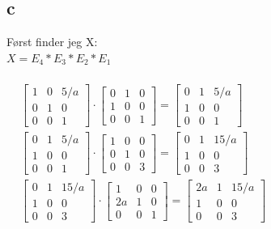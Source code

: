 \documentclass{article}
\begin{document}
\subsection*{c}
Først finder jeg X:
\\
$X=E_4*E_3*E_2*E_1$
\\
\\
$\begin{aligned} & {\left[\begin{array}{lll}1 & 0 & 5 / a \\ 0 & 1 & 0 \\ 0 & 0 & 1\end{array}\right] \cdot\left[\begin{array}{lll}0 & 1 & 0 \\ 1 & 0 & 0 \\ 0 & 0 & 1\end{array}\right]=\left[\begin{array}{lll}0 & 1 & 5 / a \\ 1 & 0 & 0 \\ 0 & 0 & 1\end{array}\right]} \\ & {\left[\begin{array}{lll}0 & 1 & 5 / a \\ 1 & 0 & 0 \\ 0 & 0 & 1\end{array}\right] \cdot\left[\begin{array}{lll}1 & 0 & 0 \\ 0 & 1 & 0 \\ 0 & 0 & 3\end{array}\right]=\left[\begin{array}{lll}0 & 1 & 15 / a \\ 1 & 0 & 0 \\ 0 & 0 & 3\end{array}\right]} \\ & {\left[\begin{array}{lll}0 & 1 & 15 / a \\ 1 & 0 & 0 \\ 0 & 0 & 3\end{array}\right] \cdot\left[\begin{array}{lll}1 & 0 & 0 \\ 2 a & 1 & 0 \\ 0 & 0 & 1\end{array}\right]=\left[\begin{array}{ccc}2 a & 1 & 15 / a \\ 1 & 0 & 0 \\ 0 & 0 & 3\end{array}\right]}\end{aligned}$
\end{document}

